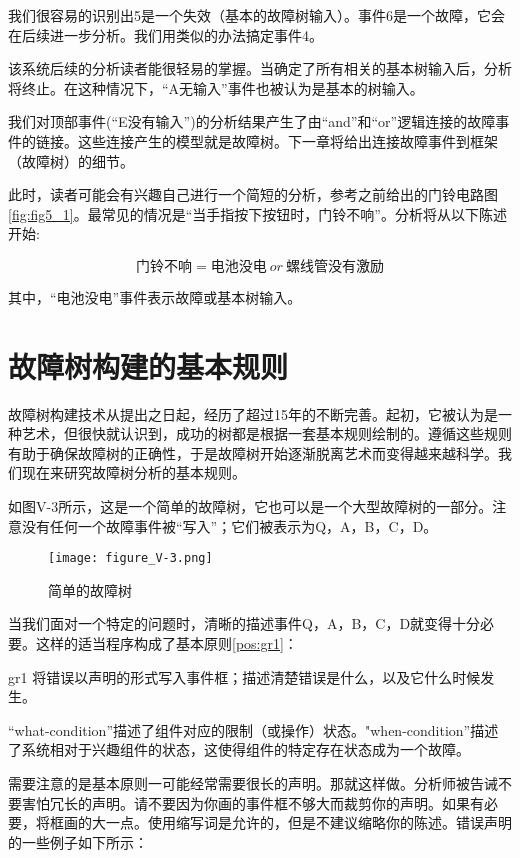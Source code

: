 \documentclass[cn,11pt,chinese]{elegantbook}
\begin{document}
我们很容易的识别出5是一个失效（基本的故障树输入）。事件6是一个故障，它会在后续进一步分析。我们用类似的办法搞定事件4。

该系统后续的分析读者能很轻易的掌握。当确定了所有相关的基本树输入后，分析将终止。在这种情况下，“A无输入”事件也被认为是基本的树输入。

我们对顶部事件(“E没有输入”)的分析结果产生了由“and”和“or”逻辑连接的故障事件的链接。这些连接产生的模型就是故障树。下一章将给出连接故障事件到框架（故障树）的细节。

此时，读者可能会有兴趣自己进行一个简短的分析，参考之前给出的门铃电路图\ref{fig:fig5_1}。最常见的情况是“当手指按下按钮时，门铃不响”。分析将从以下陈述开始:

 $$ \mbox{门铃不响} = \mbox{电池没电} \ or \ \mbox{螺线管没有激励}$$
 
 其中，“电池没电”事件表示故障或基本树输入。
 
 \section{故障树构建的基本规则}
 
 故障树构建技术从提出之日起，经历了超过15年的不断完善。起初，它被认为是一种艺术，但很快就认识到，成功的树都是根据一套基本规则绘制的。遵循这些规则有助于确保故障树的正确性，于是故障树开始逐渐脱离艺术而变得越来越科学。我们现在来研究故障树分析的基本规则。
 
 如图V-3所示，这是一个简单的故障树，它也可以是一个大型故障树的一部分。注意没有任何一个故障事件被“写入”；它们被表示为Q，A，B，C，D。
 
 \begin{figure}[h]
 	\centering
 	\texttt{[image: figure\_V-3.png]}
 	\caption{简单的故障树}\label{fig:fig5_3}
 \end{figure}
 
 当我们面对一个特定的问题时，清晰的描述事件Q，A，B，C，D就变得十分必要。这样的适当程序构成了基本原则\ref{pos:gr1}：
 
\begin{postulate}{}{gr1}
将错误以声明的形式写入事件框；描述清楚错误是什么，以及它什么时候发生。
\end{postulate}


“what-condition”描述了组件对应的限制（或操作）状态。"when-condition”描述了系统相对于兴趣组件的状态，这使得组件的特定存在状态成为一个故障。

需要注意的是基本原则一可能经常需要很长的声明。那就这样做。分析师被告诫不要害怕冗长的声明。请不要因为你画的事件框不够大而裁剪你的声明。如果有必要，将框画的大一点。使用缩写词是允许的，但是不建议缩略你的陈述。错误声明的一些例子如下所示：
\end{document}
